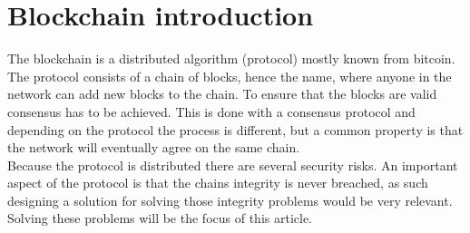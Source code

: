 \section{Blockchain introduction}
The blockchain is a distributed algorithm (protocol) mostly known from bitcoin. The protocol consists of a chain of blocks, hence the name, where anyone in the network can add new blocks to the chain. To ensure that the blocks are valid consensus has to be achieved. This is done with a consensus protocol and depending on the protocol the process is different, but a common property is that the network will eventually agree on the same chain.\\
Because the protocol is distributed there are several security risks. An important aspect of the protocol is that the chains integrity is never breached, as such designing a solution for solving those integrity problems would be very relevant. Solving these problems will be the focus of this article.
